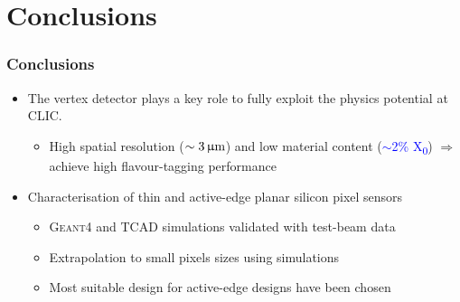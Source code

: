 \section{Conclusions}
\begin{frame}
  \frametitle{Conclusions}

  \begin{itemize}
  \item The vertex detector plays a key role to fully exploit the
    physics potential at CLIC.
    \begin{itemize}
    \item High spatial resolution (\textcolor{Blue}{$\sim3\,\upmu\mathrm{m}$})
      and low material content (\textcolor{Blue}{$\sim$2\%
        X\textsubscript{0}}) $\Rightarrow$ achieve high
      flavour-tagging performance
    \end{itemize} 
    \item Characterisation of thin and active-edge planar silicon
      pixel sensors
      \begin{itemize}
      \item \textsc{Geant4} and TCAD simulations validated with
        test-beam data
      \item Extrapolation to small pixels sizes using simulations
      \item Most suitable design for active-edge designs have been
        chosen
      \end{itemize}

  \end{itemize}

\end{frame}

